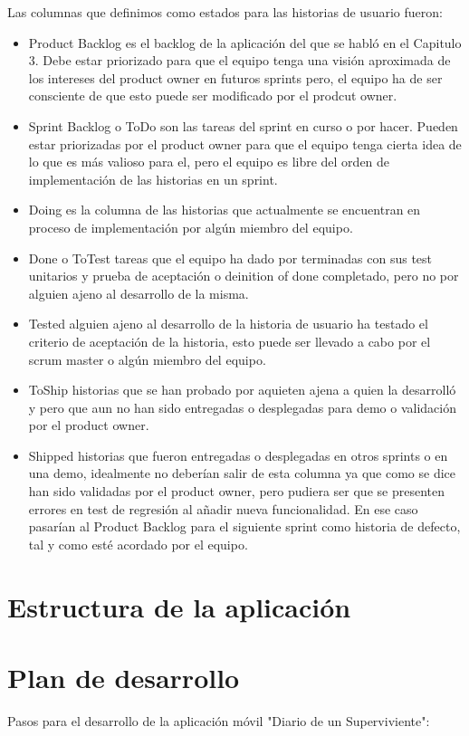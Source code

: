 \documentclass[../pfc.tex]{subfiles}
\begin{document}
	Las columnas que definimos como estados para las historias de usuario fueron:
	
	\begin{itemize} 
		\item Product Backlog es el backlog de la aplicación del que se habló en el Capitulo 3. Debe estar priorizado para que el equipo tenga una visión aproximada de los intereses del product owner en futuros sprints pero, el equipo ha de ser consciente de que esto puede ser modificado por el prodcut owner.
		\item Sprint Backlog o ToDo son las tareas del sprint en curso o por hacer. Pueden estar priorizadas por el product owner para que el equipo tenga cierta idea de lo que es más valioso para el, pero el equipo es libre del orden de implementación de las historias en un sprint. 
		\item Doing es la columna de las historias que actualmente se encuentran en proceso de implementación por algún miembro del equipo.
		\item Done o ToTest tareas que el equipo ha dado por terminadas con sus test unitarios y prueba de aceptación o deinition of done completado, pero no por alguien ajeno al desarrollo de la misma. 
		\item Tested alguien ajeno al desarrollo de la historia de usuario ha testado el criterio de aceptación de la historia, esto puede ser  llevado a cabo por el scrum master o algún miembro del equipo. 
		\item ToShip historias que se han probado por aquieten ajena a quien la desarrolló y pero que aun no han sido entregadas o desplegadas para demo o validación por el product owner.
		\item Shipped historias que fueron entregadas o desplegadas en otros sprints o en una demo, idealmente no deberían salir de esta columna ya que como se dice han sido validadas por el product owner, pero pudiera ser que se presenten errores en test de regresión al añadir nueva funcionalidad. En ese caso pasarían al Product Backlog para el siguiente sprint como historia de defecto, tal y como esté acordado por el equipo.
	\end{itemize}

	
	\section{Estructura de la aplicación}
	
	\section{Plan de desarrollo}
	Pasos para el desarrollo de la aplicación móvil "Diario de un Superviviente":\\
	
\end{document}
